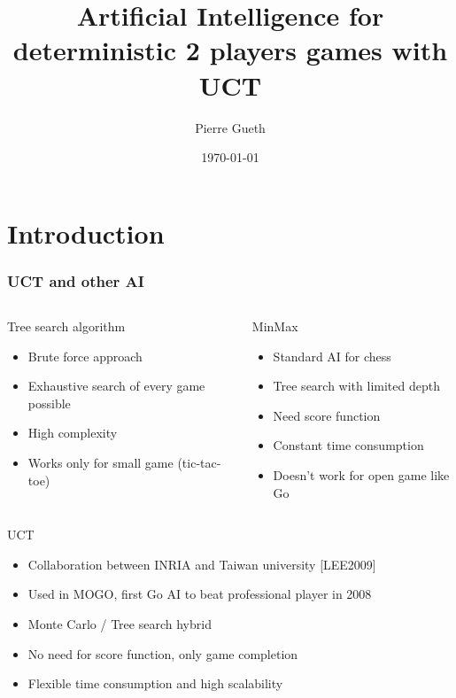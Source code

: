 \documentclass{beamer}
\title{Artificial Intelligence for deterministic 2 players games with UCT}
\author{Pierre Gueth}
\institute{}
\date{\today}
\begin{document}
\maketitle


\section{Introduction}

\begin{frame}
\frametitle{UCT and other AI}

\begin{columns}
\begin{column}{.45\linewidth}
\begin{alertblock}{Tree search algorithm}
\begin{itemize}
\item Brute force approach
\item Exhaustive search of every game possible
\item High complexity
\item Works only for small game (tic-tac-toe)
\end{itemize}
\end{alertblock} 
\end{column}
\begin{column}{.5\linewidth}
\begin{alertblock}{MinMax}
\begin{itemize}
\item Standard AI for chess
\item Tree search with limited depth
\item Need score function
\item Constant time consumption
\item Doesn't work for open game like Go
\end{itemize}
\end{alertblock}
\end{column}
\end{columns}


\begin{exampleblock}{UCT}
\begin{itemize}
\item Collaboration between INRIA and Taiwan university [LEE2009]
\item Used in MOGO, first Go AI to beat professional player in 2008
\item Monte Carlo / Tree search hybrid
\item \alert<2>{No need for score function}, only game completion
\item \alert<2>{Flexible time consumption and high scalability}
\end{itemize}
\end{exampleblock}
\end{frame}
\end{document}
